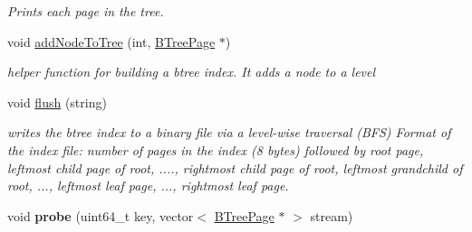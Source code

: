 \begin{DoxyCompactItemize}
\begin{DoxyCompactList}\small\item\em Prints each page in the tree. \end{DoxyCompactList}\item 
\hypertarget{class_b_tree_index_a37e5ad19a5ccc848bf9a80480e1a0ec3}{}void \hyperlink{class_b_tree_index_a37e5ad19a5ccc848bf9a80480e1a0ec3}{add\+Node\+To\+Tree} (int, \hyperlink{class_b_tree_page}{B\+Tree\+Page} $\ast$)\label{class_b_tree_index_a37e5ad19a5ccc848bf9a80480e1a0ec3}

\begin{DoxyCompactList}\small\item\em helper function for building a btree index. It adds a node to a level \end{DoxyCompactList}\item 
void \hyperlink{class_b_tree_index_a5f08960f28fbaee925bd76a225110f56}{flush} (string)
\begin{DoxyCompactList}\small\item\em writes the btree index to a binary file via a level-\/wise traversal (B\+F\+S) Format of the index file\+: number of pages in the index (8 bytes) followed by root page, leftmost child page of root, ...., rightmost child page of root, leftmost grandchild of root, ..., leftmost leaf page, ..., rightmost leaf page. \end{DoxyCompactList}\item 
\hypertarget{class_b_tree_index_a3b32e1e49d409365bffaf2f111068f23}{}void {\bfseries probe} (uint64\+\_\+t key, vector$<$ \hyperlink{class_b_tree_page}{B\+Tree\+Page} $\ast$ $>$ stream)\label{class_b_tree_index_a3b32e1e49d409365bffaf2f111068f23}


\end{DoxyCompactItemize}
